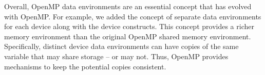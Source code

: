 Overall, OpenMP data environments are an essential concept that has evolved
with OpenMP. For example, we added the concept of separate data environments 
for each device along with the device constructs. This concept provides a 
richer memory environment than the original OpenMP shared memory environment. 
Specifically, distinct device data environments can have copies of the same 
variable that may share storage -- or may not. Thus, OpenMP provides 
mechanisms to keep the potential copies consistent.
